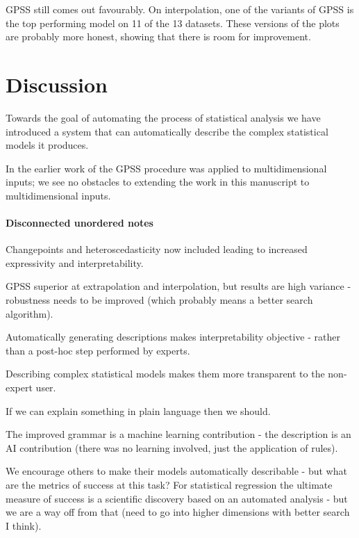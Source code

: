 \documentclass{article}
\begin{document}
GPSS still comes out favourably.
On interpolation, one of the variants of GPSS is the top performing model on 11 of the 13 datasets.
These versions of the plots are probably more honest, showing that there is room for improvement.

\section{Discussion}


Towards the goal of automating the process of statistical analysis we have introduced a system that can automatically describe the complex statistical models it produces.

In the earlier work of \cite{DuvLloGroetal13} the GPSS procedure was applied to multidimensional inputs; we see no obstacles to extending the work in this manuscript to multidimensional inputs.

\paragraph{Disconnected unordered notes}

Changepoints and heteroscedasticity now included leading to increased expressivity and interpretability.

GPSS superior at extrapolation and interpolation, but results are high variance - robustness needs to be improved (which probably means a better search algorithm).

Automatically generating descriptions makes interpretability objective - rather than a post-hoc step performed by experts.

Describing complex statistical models makes them more transparent to the non-expert user.

If we can explain something in plain language then we should.

The improved grammar is a machine learning contribution - the description is an AI contribution (there was no learning involved, just the application of rules).

We encourage others to make their models automatically describable - but what are the metrics of success at this task?
For statistical regression the ultimate measure of success is a scientific discovery based on an automated analysis - but we are a way off from that (need to go into higher dimensions with better search I think).
\end{document}
